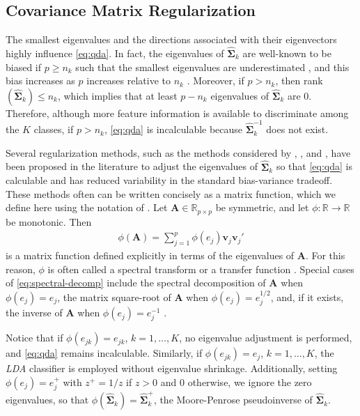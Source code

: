 \documentclass[11pt]{article}
\begin{document}
\subsection{Covariance Matrix Regularization}

The smallest eigenvalues and the directions associated with their eigenvectors highly influence \eqref{eq:qda}. In fact, the eigenvalues of $\widehat{\bm \Sigma}_k$ are well-known to be biased if $p \ge n_k$ such that the smallest eigenvalues are underestimated \citep{Seber:2004uh}, and this bias increases as $p$ increases relative to $n_k$ \citep{TODONeedCitation}. Moreover, if $p > n_k$, then rank$(\widehat{\bm \Sigma}_k) \le n_k$, which implies that at least $p - n_k$ eigenvalues of $\widehat{\bm \Sigma}_k$ are 0. Therefore, although more feature information is available to discriminate among the $K$ classes, if $p > n_k$, \eqref{eq:qda} is incalculable because $\widehat{\bm \Sigma}_k^{-1}$ does not exist.

Several regularization methods, such as the methods considered by \citet*{Guo:2007te}, \cite{Mkhadri:1995jp}, and \citet*{Xu:2009fl}, have been proposed in the literature to adjust the eigenvalues of $\widehat{\bm \Sigma}_k$ so that \eqref{eq:qda} is calculable and has reduced variability in the standard bias-variance tradeoff. These methods often can be written concisely as a matrix function, which we define here using the notation of \cite{Izenman:2008gm}. Let $\bm A \in \mathbb{R}_{p \times p}$ be symmetric, and let $\phi:\mathbb{R} \rightarrow \mathbb{R}$ be monotonic. Then
\begin{align}
	\phi(\bm A) = \sum_{j = 1}^p \phi(e_j) \bm v_j \bm v_j'\label{eq:spectral-decomp}
\end{align}
is a matrix function defined explicitly in terms of the eigenvalues of $\bm A$. For this reason, $\phi$ is often called a spectral transform \citep{Zhu:2010vu} or a transfer function \citep{Ye:2009gd}. Special cases of \eqref{eq:spectral-decomp} include the spectral decomposition of $\bm A$ when $\phi(e_j) = e_j$, the matrix square-root of $\bm A$ when $\phi(e_j) = e_j^{1/2}$, and, if it exists, the inverse of $\bm A$ when $\phi(e_j) = e_j^{-1}$ \citep{Harville:2008wja}.

Notice that if  $\phi(e_{jk}) = e_{jk}$, $k = 1, \ldots, K$, no eigenvalue adjustment is performed, and \eqref{eq:qda} remains incalculable. Similarly, if $\phi(e_{jk}) = e_{j}$, $k = 1, \ldots, K$, the \emph{LDA} classifier is employed without eigenvalue shrinkage. Additionally, setting $\phi(e_j) = e_j^{+}$ with $z^{+} = 1/z$ if $z > 0$ and $0$ otherwise, we ignore the zero eigenvalues, so that $\phi(\widehat{\bm \Sigma}_k) = \widehat{\bm \Sigma}_k^{+}$, the Moore-Penrose pseudoinverse of $\widehat{\bm \Sigma}_k$.
\end{document}
